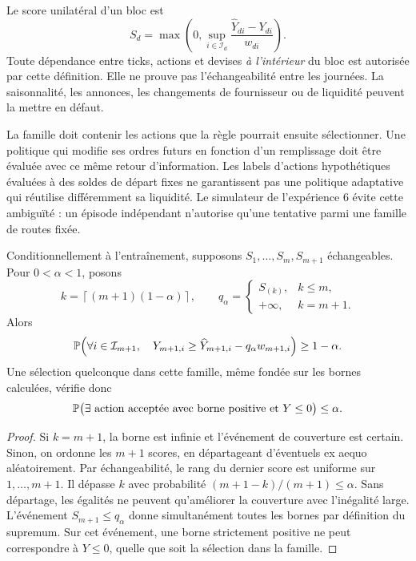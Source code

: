 Le score unilatéral d'un bloc est
\begin{equation}
 S_d=\max\left(0,\sup_{i\in\mathcal I_d}
       \frac{\widehat Y_{di}-Y_{di}}{w_{di}}\right).
 \label{eq:ext-block-score}
\end{equation}
Toute dépendance entre ticks, actions et devises \emph{à l'intérieur} du bloc est autorisée par cette définition. Elle ne prouve pas l'échangeabilité entre les journées. La saisonnalité, les annonces, les changements de fournisseur ou de liquidité peuvent la mettre en défaut.

La famille doit contenir les actions que la règle pourrait ensuite sélectionner. Une politique qui modifie ses ordres futurs en fonction d'un remplissage doit être évaluée avec ce même retour d'information. Les labels d'actions hypothétiques évaluées à des soldes de départ fixes ne garantissent pas une politique adaptative qui réutilise différemment sa liquidité. Le simulateur de l'expérience 6 évite cette ambiguïté : un épisode indépendant n'autorise qu'une tentative parmi une famille de routes fixée.

\begin{proposition}
Conditionnellement à l'entraînement, supposons \(S_1,\ldots,S_m,S_{m+1}\) échangeables. Pour \(0<\alpha<1\), posons
\begin{equation}
 k=\left\lceil(m+1)(1-\alpha)\right\rceil,\qquad
 q_\alpha=\begin{cases}S_{(k)},&k\le m,\\+\infty,&k=m+1.\end{cases}
 \label{eq:ext-rank}
\end{equation}
Alors
\begin{equation}
 \mathbb P\!\left(\forall i\in\mathcal I_{m+1},\quad
 Y_{m+1,i}\ge\widehat Y_{m+1,i}-q_\alpha w_{m+1,i}\right)\ge1-\alpha.
 \label{eq:ext-coverage}
\end{equation}
Une sélection quelconque dans cette famille, même fondée sur les bornes calculées, vérifie donc
\begin{equation}
 \mathbb P\bigl(\exists\hbox{ action acceptée avec borne positive et }Y\le0\bigr)\le\alpha.
 \label{eq:ext-false-accept}
\end{equation}
\end{proposition}
\begin{proof}
Si \(k=m+1\), la borne est infinie et l'événement de couverture est certain. Sinon, on ordonne les \(m+1\) scores, en départageant d'éventuels ex aequo aléatoirement. Par échangeabilité, le rang du dernier score est uniforme sur \(1,\ldots,m+1\). Il dépasse \(k\) avec probabilité \((m+1-k)/(m+1)\le\alpha\). Sans départage, les égalités ne peuvent qu'améliorer la couverture avec l'inégalité large. L'événement \(S_{m+1}\le q_\alpha\) donne simultanément toutes les bornes par définition du supremum. Sur cet événement, une borne strictement positive ne peut correspondre à \(Y\le0\), quelle que soit la sélection dans la famille.
\end{proof}

